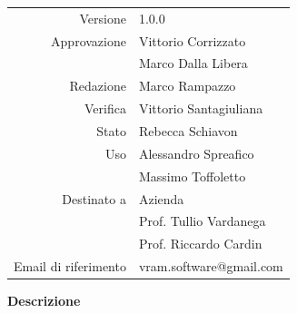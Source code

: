 \begin{titlepage}
\begin{center}
		\begin{tabular}{r | l} 
			Versione & 1.0.0 \\    %
			Approvazione & Vittorio Corrizzato \\  %
						 & Marco Dalla Libera \\
			Redazione & Marco Rampazzo \\
			Verifica & Vittorio Santagiuliana \\
			Stato & Rebecca Schiavon \\
			Uso & Alessandro Spreafico \\
				& Massimo Toffoletto \\
		    Destinato a & Azienda \\
						& Prof. Tullio Vardanega \\
						& Prof. Riccardo Cardin \\
			Email di riferimento& vram.software@gmail.com
		\end{tabular}
		\vfill
		\textbf{Descrizione} \\
		\DocDesc
	\end{center}
\end{titlepage}
\clearpage

\renewcommand{\footrulewidth}{1pt} %
\tableofcontents %
\label{LastPageRoman} %
\clearpage


\clearpage